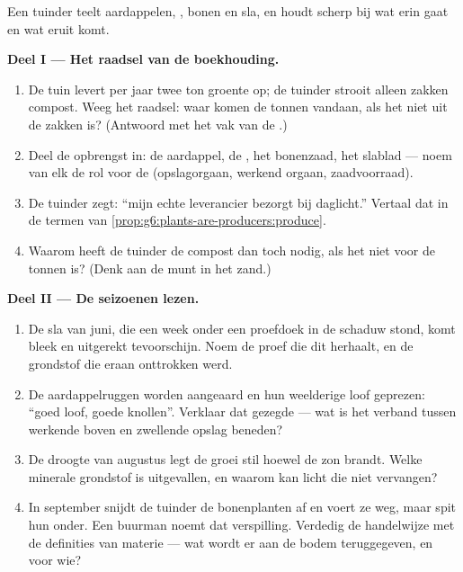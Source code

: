 \begin{problem}\label{pb:g6:plants-are-producers:1}
Een tuinder teelt aardappelen, , bonen en sla, en houdt scherp bij
wat erin gaat en wat eruit komt.

\medskip\noindent\textbf{Deel I --- Het raadsel van de boekhouding.}
\begin{enumerate}
  \item De tuin levert per jaar twee ton groente op; de tuinder strooit
        alleen zakken compost. Weeg het raadsel: waar komen de tonnen
        vandaan, als het niet uit de zakken is? (Antwoord met het vak van
        de .)
  \item Deel de opbrengst in: de aardappel, de , het bonenzaad, het
        slablad --- noem van elk de rol voor de  (opslagorgaan,
        werkend orgaan, zaadvoorraad).
  \item De tuinder zegt: ``mijn echte leverancier bezorgt bij daglicht.''
        Vertaal dat in de termen van
        \cref{prop:g6:plants-are-producers:produce}.
  \item Waarom heeft de tuinder de compost dan toch nodig, als het niet
        voor de tonnen is? (Denk aan de munt in het zand.)
\end{enumerate}

\medskip\noindent\textbf{Deel II --- De seizoenen lezen.}
\begin{enumerate}[resume]
  \item De sla van juni, die een week onder een proefdoek in de schaduw
        stond, komt bleek en uitgerekt tevoorschijn. Noem de proef die
        dit herhaalt, en de grondstof die eraan onttrokken werd.
  \item De aardappelruggen worden aangeaard en hun weelderige loof
        geprezen: ``goed loof, goede knollen''. Verklaar dat gezegde ---
        wat is het verband tussen werkende  boven en zwellende
        opslag beneden?
  \item De droogte van augustus legt de groei stil hoewel de zon brandt.
        Welke minerale grondstof is uitgevallen, en waarom kan licht die
        niet vervangen?
  \item In september snijdt de tuinder de bonenplanten af en voert ze
        weg, maar spit hun  onder. Een buurman noemt dat
        verspilling. Verdedig de handelwijze met de definities van
        materie --- wat wordt er aan de bodem teruggegeven, en voor wie?
\end{enumerate}


\end{problem}
